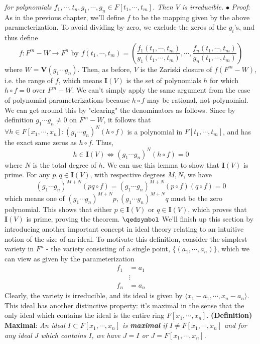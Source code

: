 \documentclass{article}
\newcommand*{\tb}{\textbf}
\newcommand*{\ti}{\textit}
\newcommand*{\n}{\newline}
\newcommand*{\nn}{\newline \newline}
\newcommand*{\Pf}{\indent \ensuremath{\bullet} \textit{Proof}: }
\newcommand*{\Fx}{\ensuremath{F[x_1, \cdots, x_n]}}
\newcommand*{\Ft}{\ensuremath{F[t_1, \cdots, t_m]}}
\newcommand*{\V}{\ensuremath{\mathbf{V}}}
\newcommand*{\IV}{\ensuremath{\mathbf{I}(V)}}
\begin{document}
\indent \ti{for polynomials $ f_1, \cdots, t_n, g_1, \cdots, g_n \in \Ft $. Then $ V $ is irreducible.}
\n
\Pf As in the previous chapter, we'll define $ f $ to be the mapping given by the above parameterization. To avoid dividing by zero, we exclude the zeros of the $ g_i $'s, and thus define
$$ f: F^m - W \rightarrow F^n \text{ by } f(t_1, \cdots, t_m) = \left( \frac{f_1(t_1, \cdots, t_m)}{g_1(t_1, \cdots, t_m)}, \cdots,  \frac{f_n(t_1, \cdots, t_m)}{g_n(t_1, \cdots, t_m)} \right) $$
where $ W = \V(g_1 \cdots g_n) $. Then, as before, $ V $ is the Zariski closure of $ f(F^m - W) $, i.e. the range of $ f $, which means $ \IV $ is the set of polynomials $ h $ for which $ h \circ f = 0 $ over $ F^m - W $. We can't simply apply the same argument from the case of polynomial parameterizations because $ h \circ f $ may be rational, not polynomial. We can get around this by "clearing" the denominators as follows. Since by definition $ g_1 \cdots g_n \neq 0 $ on $ F^m - W $, it follows that $ \forall h \in \Fx: (g_1 \cdots g_n)^N (h \circ f) $ is a polynomial in $ \Ft $, and has the exact same zeros as $ h \circ f $. Thus,
$$ h \in \IV \iff (g_1 \cdots g_n)^N (h \circ f) = 0 $$
where $ N $ is the total degree of $ h $. We can use this lemma to show that $ \IV $ is prime. For any $ p, q \in \IV $, with respective degrees $ M, N $, we have
$$ (g_1 \cdots g_n)^{M + N} (p q \circ f) = (g_1 \cdots g_n)^{M + N} (p \circ f) (q \circ f) = 0 $$
which means one of $ (g_1 \cdots g_n)^{M + N} p, (g_1 \cdots g_n)^{M + N} q $ must be the zero polynomial. This shows that either $ p \in \IV $ or $ q \in \IV $, which proves that $ \IV $ is prime, proving the theorem. $ \qedsymbol $
\nn
We'll finish up this section by introducing another important concept in ideal theory relating to an intuitive notion of the size of an ideal. To motivate this definition, consider the simplest variety in $ F^n $ - the variety consisting of a single point, $ \{ (a_1, \cdots, a_n) \} $, which we can view as given by the parameterization
$$ \begin{aligned}
    f_1 &= a_1 \\
    & \vdots \\
    f_n &= a_n
\end{aligned} $$
Clearly, the variety is irreducible, and its ideal is given by $ \langle x_1 - a_1, \cdots, x_n - a_n \rangle $. This ideal has another distinctive property: it's maximal in the sense that the only ideal which contains the ideal is the entire ring $ \Fx $.
\nn
\tb{(Definition) Maximal}: \ti{An ideal $ I \subset \Fx $ is \tb{maximal} if $ I \neq \Fx $ and for any ideal $ J $ which contains $ I $, we have $ J = I $ or $ J = \Fx $.}
\end{document}
